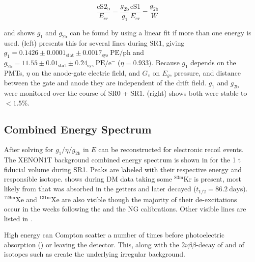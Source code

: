 \begin{equation}
\frac{\mathrm{cS2_b}}{E_{er}} = \frac{g_{2\mathrm{b}}}{g_1} \frac{\mathrm{cS1}}{E_{er}} - \frac{g_{2 \mathrm{b}}}{W}
\end{equation}

\noindent and shows $g_1$ and $g_{2\mathrm{b}}$ can be found by using a linear fit if more than one energy is
used.   (left) presents this for several lines
during SR1, giving
$g_1 = 0.1426 \pm 0.0001_{\mathrm{stat}} \pm 0.0017_{\mathrm{sys}}\ \mathrm{PE/ph}$ and
$g_{2 \mathrm{b}} = 11.55 \pm 0.01_{\mathrm{stat}} \pm 0.24_{\mathrm{sys}}\ \mathrm{PE/e^-}$ ($\eta = 0.933$).  Because $g_1$ depends on
the PMTs, $\eta$ on the anode-gate electric field, and $G_e$ on $E_g$, pressure, and distance between the gate and anode they are
independent of the
drift field.  $g_1$ and $g_{2 \mathrm{b}}$ were monitored over the
course of SR0 + SR1.   (right) shows both
were stable to $< 1.5 \%$.



\subsection{Combined Energy Spectrum}
\label{subsec:det_char_ces}
After solving for $g_1/\eta/g_{2 \mathrm{b}}$ in  $E$ can be reconstructed for electronic recoil
events.  The XENON1T
background combined energy spectrum is shown in  for the 1 t fiducial volume during
SR1.  Peaks are labeled with their respective energy and responsible
isotope.   shows during DM data taking some $\mathrm{^{83m}Kr}$ is present, most
likely from  that was absorbed in the getters and later decayed ($t_{1/2} = 86.2\ \mathrm{days}$).  $\mathrm{^{129m}Xe}$ and
$\mathrm{^{131m}Xe}$ are also visible though the majority of their de-excitations occur in the weeks following the \ambe and the NG
calibrations.  Other visible lines are listed in .

High energy \gammarays can Compton scatter a number of times before photoelectric absorption () or leaving the
detector.  This, along with the $2 \nu \beta \beta$-decay of  and \betadecays of isotopes such as  create the
underlying irregular background.

